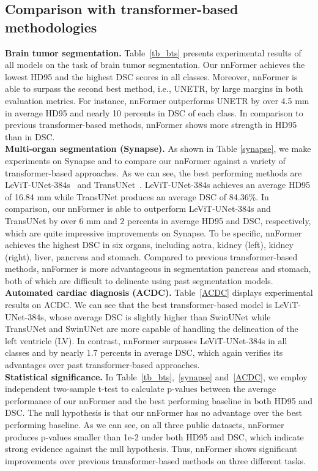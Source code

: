 \documentclass[journal,twoside,web]{ieeecolor}
\begin{document}
\subsection{Comparison with transformer-based methodologies}
\noindent \textbf{Brain tumor segmentation.} Table~\ref{tb_bts} presents experimental results of all models on the task of brain tumor segmentation. Our nnFormer achieves the lowest HD95 and the highest DSC scores in all classes. Moreover, nnFormer is able to surpass the second best method, i.e., UNETR, by large margins in both evaluation metrics. For instance, nnFormer outperforms UNETR by over 4.5 mm in average HD95 and nearly 10 percents in DSC of each class. In comparison to previous transformer-based methods, nnFormer shows more strength in HD95 than in DSC.\\

\noindent \textbf{Multi-organ segmentation (Synapse).} As shown in Table \ref{synapse}, we make experiments on Synapse and to compare our nnFormer against a variety of transformer-based approaches. As we can see, the best performing methods are LeViT-UNet-384s~\cite{xu2021levit} and TransUNet~\cite{chen2021transunet}. LeViT-UNet-384s achieves an average HD95 of 16.84 mm while TransUNet produces an average DSC of 84.36\%. In comparison, our nnFormer is able to outperform LeViT-UNet-384s and TransUNet by over 6 mm and 2 percents in average HD95 and DSC, respectively, which are quite impressive improvements on Synapse. To be specific, nnFormer achieves the highest DSC in six organs, including aotra, kidney (left), kidney (right), liver, pancreas and stomach. Compared to previous transformer-based methods, nnFormer is more advantageous in segmentation pancreas and stomach, both of which are difficult to delineate using past segmentation models.\\

\noindent \textbf{Automated cardiac diagnosis (ACDC).} Table~\ref{ACDC} displays experimental results on ACDC. We can see that the best transformer-based model is LeViT-UNet-384s, whose average DSC is slightly higher than SwinUNet while TransUNet and SwinUNet are more capable of handling the delineation of the left ventricle (LV). In contrast, nnFormer surpasses LeViT-UNet-384s in all classes and by nearly 1.7 percents in average DSC, which again verifies its advantages over past transformer-based approaches.\\

\noindent \textbf{Statistical significance.} In Table~\ref{tb_bts},~\ref{synapse} and~\ref{ACDC}, we employ independent two-sample t-test to calculate p-values between the average performance of our nnFormer and the best performing baseline in both HD95 and DSC. The null hypothesis is that our nnFormer has no advantage over the best performing baseline. As we can see, on all three public datasets, nnFormer produces p-values smaller than 1e-2 under both HD95 and DSC, which indicate strong evidence against the null hypothesis. Thus, nnFormer shows significant improvements over previous transformer-based methods on three different tasks.
\end{document}
